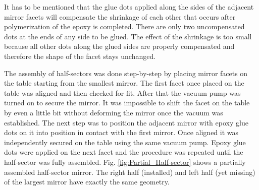 It has to be mentioned that the glue dots applied along the sides of the adjacent mirror facets will compensate the shrinkage of each other that occurs after polymerization of the epoxy is completed. There are only two uncompensated dots at the ends of any side to be glued. The effect of the shrinkage is too small because all other dots along the glued sides are properly compensated and therefore the shape of the facet stays unchanged. 

The assembly of half-sectors was done step-by-step by placing mirror facets on the table starting from the smallest mirror. The first facet once placed on the table was aligned and then checked for fit. After that the vacuum pump was turned on to secure the mirror. It was impossible to shift the facet on the table by even a little bit without deforming the mirror once the vacuum was established. The next step was to position the adjacent mirror with epoxy glue dots on it into position in contact with the first mirror. Once aligned it was independently secured on the table using the same vacuum pump. Epoxy glue dots were applied on the next facet and the procedure was repeated until the half-sector was fully assembled. Fig. \ref{fig:Partial_Half-sector} shows a partially assembled half-sector mirror. The right half (installed) and left half (yet missing) of the largest mirror have exactly the same geometry.

